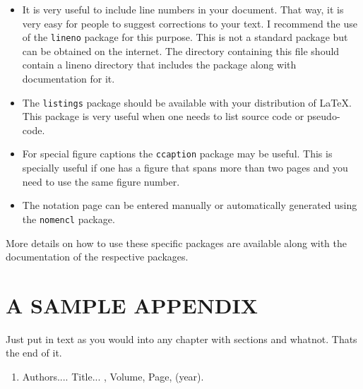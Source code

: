 \documentclass[BTech]{cetlyproj}
\begin{document}
\begin{itemize}  
\item It is very useful to include line numbers in your document.
  That way, it is very easy for people to suggest corrections to your
  text.  I recommend the use of the \texttt{lineno} package for this
  purpose.  This is not a standard package but can be obtained on the
  internet.  The directory containing this file should contain a
  lineno directory that includes the package along with documentation
  for it.

\item The \texttt{listings} package should be available with your
  distribution of \LaTeX.  This package is very useful when one needs
  to list source code or pseudo-code.

\item For special figure captions the \texttt{ccaption} package may be
  useful.  This is specially useful if one has a figure that spans
  more than two pages and you need to use the same figure number.

\item The notation page can be entered manually or automatically
  generated using the \texttt{nomencl} package.

\end{itemize}

More details on how to use these specific packages are available along
with the documentation of the respective packages.


\appendix

\chapter{A SAMPLE APPENDIX}

Just put in text as you would into any chapter with sections and
whatnot.  Thats the end of it.


\begin{singlespace}
  
\end{singlespace}



\listofpapers

\begin{enumerate}  
\item Authors....  \newblock
 Title...
  , Volume,
  Page, (year).
\end{enumerate}  
\end{document}
